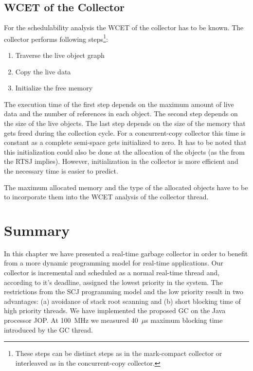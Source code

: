 \subsection{WCET of the Collector}

For the schedulability analysis the WCET of the collector has to be
known. The collector performs following steps\footnote{These steps
can be distinct steps as in the mark-compact collector or
interleaved as in the concurrent-copy collector.}:
\begin{enumerate}
    \item Traverse the live object graph
    \item Copy the live data
    \item Initialize the free memory
\end{enumerate}

The execution time of the first step depends on the maximum amount
of live data and the number of references in each object. The second
step depends on the size of the live objects. The last step depends
on the size of the memory that gets freed during the collection
cycle. For a concurrent-copy collector this time is constant as a
complete semi-space gets initialized to zero. It has to be noted
that this initialization could also be done at the allocation of the
objects (as the  from the RTSJ implies). However,
initialization in the collector is more efficient and the necessary
time is easier to predict.

The maximum allocated memory and the type of the allocated objects
have to be to incorporate them into the WCET analysis of the
collector thread.

\section{Summary} \label{sec:gc:summery}

In this chapter we have presented a real-time garbage collector in
order to benefit from a more dynamic programming model for real-time
applications. Our collector is incremental and scheduled as a normal
real-time thread and, according to it's deadline, assigned the
lowest priority in the system. The restrictions from the SCJ
programming model and the low priority result in two advantages: (a)
avoidance of stack root scanning and (b) short blocking time of high
priority threads. We have implemented the proposed GC on the Java
processor JOP. At 100~MHz we measured 40~$\mu$s maximum blocking
time introduced by the GC thread.

